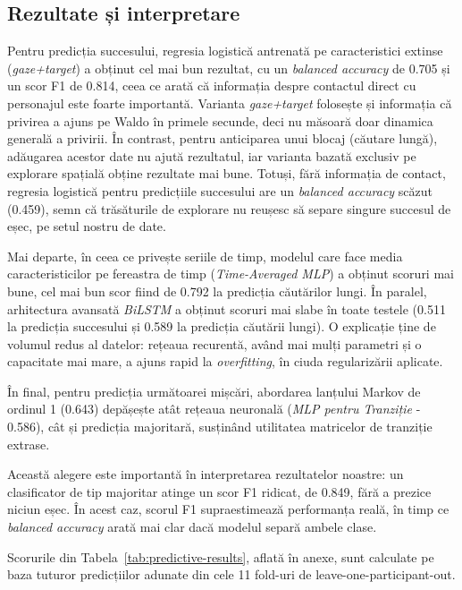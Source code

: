 \subsection{Rezultate și interpretare} 
 
Pentru predicția succesului, regresia logistică antrenată pe caracteristici extinse (\emph{gaze+target}) a obținut cel mai bun rezultat, cu un \emph{balanced accuracy} de 0.705 și un scor F1 de 0.814, ceea ce arată că informația despre contactul direct cu personajul este foarte importantă. Varianta \emph{gaze+target} folosește și informația că privirea a ajuns pe Waldo în primele secunde, deci nu măsoară doar dinamica generală a privirii. În contrast, pentru anticiparea unui blocaj (căutare lungă), adăugarea acestor date nu ajută rezultatul, iar varianta bazată exclusiv pe explorare spațială obține rezultate mai bune. Totuși, fără informația de contact, regresia logistică pentru predicțiile succesului are un \emph{balanced accuracy} scăzut (0.459), semn că trăsăturile de explorare nu reușesc să separe singure succesul de eșec, pe setul nostru de date.

Mai departe, în ceea ce privește seriile de timp, modelul care face media caracteristicilor pe fereastra de timp (\emph{Time-Averaged MLP}) a obținut scoruri mai bune, cel mai bun scor fiind de 0.792 la predicția căutărilor lungi. În paralel, arhitectura avansată \emph{BiLSTM} a obținut scoruri mai slabe în toate testele (0.511 la predicția succesului și 0.589 la predicția căutării lungi). O explicație ține de volumul redus al datelor: rețeaua recurentă, având mai mulți parametri și o capacitate mai mare, a ajuns rapid la \emph{overfitting}, în ciuda regularizării aplicate.

În final, pentru predicția următoarei mișcări, abordarea lanțului Markov de ordinul 1 (0.643) depășește atât rețeaua neuronală (\emph{MLP pentru Tranziție} - 0.586), cât și predicția majoritară, susținând utilitatea matricelor de tranziție extrase.

Această alegere este importantă în interpretarea rezultatelor noastre: un clasificator de tip majoritar atinge un scor F1 ridicat, de 0.849, fără a prezice niciun eșec. În acest caz, scorul F1 supraestimează performanța reală, în timp ce \emph{balanced accuracy} arată mai clar dacă modelul separă ambele clase.

Scorurile din Tabela~\ref{tab:predictive-results}, aflată în anexe, sunt calculate pe baza tuturor predicțiilor adunate din cele 11 fold-uri de leave-one-participant-out.


